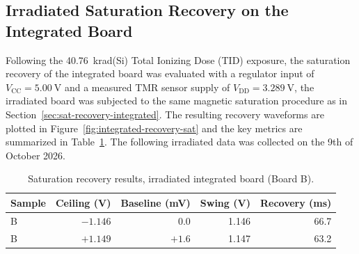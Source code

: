 \documentclass[12pt,a4paper]{article}
\begin{document}
\subsection{Irradiated Saturation Recovery on the Integrated Board}
\label{sec:sat-recovery-irradiated}

Following the \SI{40.76}{\kilo rad}(Si) Total Ionizing Dose (TID) exposure, the saturation recovery of the integrated board was evaluated with a regulator input of $V_{\text{CC}} = \SI{5.00}{\volt}$ and a measured TMR sensor supply of $V_{\text{DD}} = \SI{3.289}{\volt}$, the irradiated board was subjected to the same magnetic saturation procedure as in Section~\ref{sec:sat-recovery-integrated}. The resulting recovery waveforms are plotted in Figure~\ref{fig:integrated-recovery-sat} and the key metrics are summarized in Table~\ref{tab:sat-ceiling-iradl}. The following irradiated data was collected on the 9th of October 2026. 


\begin{table}[H]
\centering
\caption{Saturation recovery results, irradiated integrated board (Board B).}
\label{tab:sat-ceiling-iradl}
\begin{tabular}{@{}lrrrr@{}}
\toprule
Sample & Ceiling (V) & Baseline (mV) & Swing (V) & Recovery (ms) \\
\midrule
B & $-1.146$ & $0.0$ & 1.146 & 66.7 \\
B & $+1.149$ & $+1.6$ & 1.147 & 63.2 \\
\bottomrule
\end{tabular}
\end{table}
\end{document}
